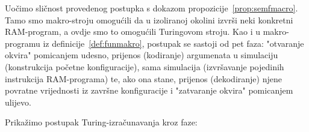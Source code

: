 Uočimo sličnost provedenog postupka s dokazom propozicije~\ref{prop:semfmacro}. Tamo smo makro-stroju omogućili da u izoliranoj okolini izvrši neki konkretni RAM-program, a ovdje smo to omogućili Turingovom stroju. Kao i u makro-programu iz definicije~\ref{def:funmakro}, postupak se sastoji od pet faza: "otvaranje okvira" pomicanjem udesno, prijenos (kodiranje) argumenata u simulaciju (konstrukcija početne konfiguracije), sama simulacija (izvršavanje pojedinih instrukcija RAM-programa) te, ako ona stane, prijenos (dekodiranje) njene povratne vrijednosti iz završne konfiguracije i "zatvaranje okvira" pomicanjem ulijevo.

Prikažimo postupak Turing-iz\-ra\-ču\-na\-va\-nja kroz faze: %
